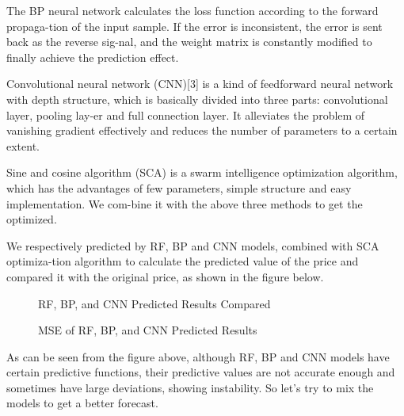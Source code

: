 The BP neural network calculates the loss function according to the forward propaga-tion of the input sample. If the error is inconsistent, the error is sent back as the reverse sig-nal, and the weight matrix is constantly modified to finally achieve the prediction effect.

Convolutional neural network (CNN)[3] is a kind of feedforward neural network with depth structure, which is basically divided into three parts: convolutional layer, pooling lay-er and full connection layer. It alleviates the problem of vanishing gradient effectively and reduces the number of parameters to a certain extent.

Sine and cosine algorithm (SCA) is a swarm intelligence optimization algorithm, which has the advantages of few parameters, simple structure and easy implementation. We com-bine it with the above three methods to get the optimized.

We respectively predicted by RF, BP and CNN models, combined with SCA optimiza-tion algorithm to calculate the predicted value of the price and compared it with the original price, as shown in the figure below.

\begin{figure}[H]
    \centering    
	\caption{RF, BP, and CNN Predicted Results Compared} %
\end{figure}
\begin{figure}[H]
    \centering  
    \caption{MSE of RF, BP, and CNN Predicted Results} %
\end{figure}
\vspace{-0.5cm}
As can be seen from the figure above, although RF, BP and CNN models have certain predictive functions, their predictive values are not accurate enough and sometimes have large deviations, showing instability. So let's try to mix the models to get a better forecast.

